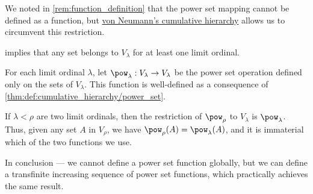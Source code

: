 \begin{remark}\label{rem:pow_in_cumulative_hierarchy}
  We noted in \cref{rem:function_definition} that the power set mapping cannot be defined as a function, but \hyperref[def:cumulative_hierarchy]{von Neumann's cumulative hierarchy} allows us to circumvent this restriction.

   implies that any set belongs to \( V_\lambda \) for at least one limit ordinal.

  For each limit ordinal \( \lambda \), let \( \pow_\lambda: V_\lambda \to V_\lambda \) be the power set operation defined only on the sets of \( V_\lambda \). This function is well-defined as a consequence of \cref{thm:def:cumulative_hierarchy/power_set}.

  If \( \lambda < \rho \) are two limit ordinals, then the restriction of \( \pow_\rho \) to \( V_\lambda \) is \( \pow_\lambda \). Thus, given any set \( A \) in \( V_\rho \), we have \( \pow_\rho(A) = \pow_\lambda(A) \), and it is immaterial which of the two functions we use.

  In conclusion --- we cannot define a power set function globally, but we can define a transfinite increasing sequence of power set functions, which practically achieves the same result.
\end{remark}

